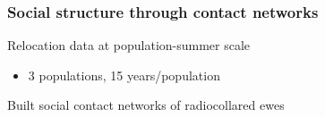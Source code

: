 \documentclass[fleqn,xcolor=table]{beamer}
\begin{document}
%


\begin{frame}[t]
\frametitle{\color{darkred} Social structure through contact networks}
	\begin{itemize}
		{\small
		\item \color{navy} Relocation data at population-summer scale 
			\begin{itemize}
				\item[] \color{navy} {\footnotesize 3 populations, 15
					years/population}
			\end{itemize}
		\item \color{navy} Built social contact networks of radiocollared ewes
		}
	\end{itemize}
	\vspace{.3in}
%
	\hspace{.15in}
\end{frame}
\end{document}
